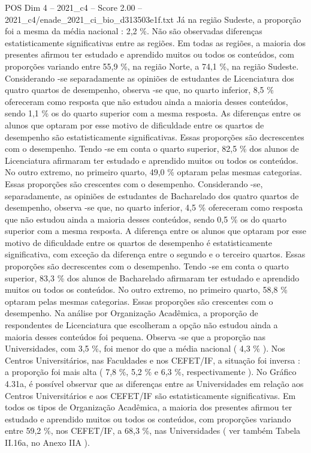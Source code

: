 \begin{textsample}{POS Dim 4 – 2021\_c4 – Score 2.00 – 2021\_c4/enade\_2021\_ci\_bio\_d313503e1f.txt}
Já na região Sudeste, a proporção foi a mesma da média nacional : 2,2 \%.
Não são observadas diferenças estatisticamente significativas entre as regiões.
Em todas as regiões, a maioria dos presentes afirmou ter estudado e aprendido muitos ou todos os conteúdos, com proporções variando entre 55,9 \%, na região Norte, a 74,1 \%, na região Sudeste.
Considerando -se separadamente as opiniões de estudantes de Licenciatura dos quatro quartos de desempenho, observa -se que, no quarto inferior, 8,5 \% ofereceram como resposta que não estudou ainda a maioria desses conteúdos, sendo 1,1 \% os do quarto superior com a mesma resposta.
As diferenças entre os alunos que optaram por esse motivo de dificuldade entre os quartos de desempenho são estatisticamente significativas.
Essas proporções são decrescentes com o desempenho.
Tendo -se em conta o quarto superior, 82,5 \% dos alunos de Licenciatura afirmaram ter estudado e aprendido muitos ou todos os conteúdos.
No outro extremo, no primeiro quarto, 49,0 \% optaram pelas mesmas categorias.
Essas proporções são crescentes com o desempenho.
Considerando -se, separadamente, as opiniões de estudantes de Bacharelado dos quatro quartos de desempenho, observa -se que, no quarto inferior, 4,5 \% ofereceram como resposta que não estudou ainda a maioria desses conteúdos, sendo 0,5 \% os do quarto superior com a mesma resposta.
A diferença entre os alunos que optaram por esse motivo de dificuldade entre os quartos de desempenho é estatisticamente significativa, com exceção da diferença entre o segundo e o terceiro quartos.
Essas proporções são decrescentes com o desempenho.
Tendo -se em conta o quarto superior, 83,3 \% dos alunos de Bacharelado afirmaram ter estudado e aprendido muitos ou todos os conteúdos.
No outro extremo, no primeiro quarto, 58,8 \% optaram pelas mesmas categorias.
Essas proporções são crescentes com o desempenho.
Na análise por Organização Acadêmica, a proporção de respondentes de Licenciatura que escolheram a opção não estudou ainda a maioria desses conteúdos foi pequena.
Observa -se que a proporção nas Universidades, com 3,5 \%, foi menor do que a média nacional ( 4,3 \% ).
Nos Centros Universitários, nas Faculdades e nos CEFET/IF, a situação foi inversa : a proporção foi mais alta ( 7,8 \%, 5,2 \% e 6,3 \%, respectivamente ).
No Gráfico 4.31a, é possível observar que as diferenças entre as Universidades em relação aos Centros Universitários e aos CEFET/IF são estatisticamente significativas.
Em todos os tipos de Organização Acadêmica, a maioria dos presentes afirmou ter estudado e aprendido muitos ou todos os conteúdos, com proporções variando entre 59,2 \%, nos CEFET/IF, a 68,3 \%, nas Universidades ( ver também Tabela II.16a, no Anexo IIA ).

\end{textsample}
